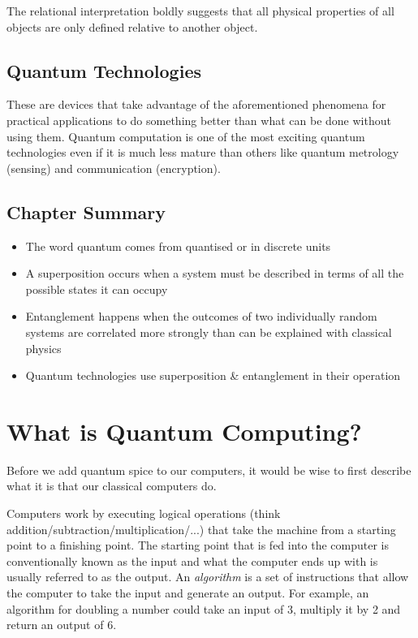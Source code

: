 \documentclass{book}
\begin{document}
The relational interpretation boldly suggests that all physical properties of all objects are only defined relative to another object. 

\section{Quantum Technologies}

These are devices that take advantage of the aforementioned phenomena for practical applications to do something better than what can be done without using them. Quantum computation is one of the most exciting quantum technologies even if it is much less mature than others like quantum metrology (sensing) and communication (encryption).

\section{Chapter Summary} 

\begin{itemize}

    \item The word quantum comes from quantised or in discrete units 
    \item A superposition occurs when a system must be described in terms of all the possible states it can occupy
    \item Entanglement happens when the outcomes of two individually random systems are correlated more strongly than can be explained with classical physics 
    \item Quantum technologies use superposition \& entanglement in their operation 
    
\end{itemize}

\chapter{What is Quantum Computing?}

Before we add quantum spice to our computers, it would be wise to first describe what it is that our classical computers do. 

Computers work by executing logical operations (think addition/subtraction/multiplication/...) that take the machine from a starting point to a finishing point. The starting point that is fed into the computer is conventionally known as the input and what the computer ends up with is usually referred to as the output. An \textit{algorithm} is a set of instructions that allow the computer to take the input and generate an output. For example, an algorithm for doubling a number could take an input of 3, multiply it by 2 and return an output of 6. 
\end{document}
